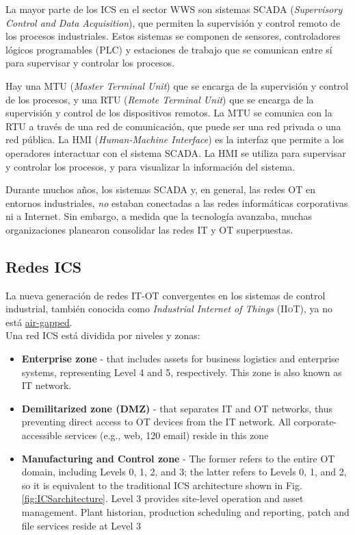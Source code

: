 La mayor parte de los \textsc{ICS} en el sector \textsc{WWS} son sistemas \textsc{SCADA} (\textit{Supervisory Control and Data Acquisition}), que permiten la supervisión y control remoto de los procesos industriales. Estos sistemas se componen de sensores, controladores lógicos programables (\textsc{PLC}) y estaciones de trabajo que se comunican entre sí para supervisar y controlar los procesos.

Hay una \textsc{MTU} (\textit{Master Terminal Unit}) que se encarga de la supervisión y control de los procesos, y una \textsc{RTU} (\textit{Remote Terminal Unit}) que se encarga de la supervisión y control de los dispositivos remotos. La \textsc{MTU} se comunica con la \textsc{RTU} a través de una red de comunicación, que puede ser una red privada o una red pública.
La \textsc{HMI} (\textit{Human-Machine Interface}) es la interfaz que permite a los operadores interactuar con el sistema \textsc{SCADA}. La \textsc{HMI} se utiliza para supervisar y controlar los procesos, y para visualizar la información del sistema.

Durante muchos años, los sistemas \textsc{SCADA} y, en general, las redes \textsc{OT} en entornos industriales, \textit{no} estaban conectadas a las redes informáticas corporativas ni a Internet. Sin embargo, a medida que la tecnología avanzaba, muchas organizaciones planearon consolidar las redes \textsc{IT} y \textsc{OT} superpuestas.

\subsection{Redes ICS}

La nueva generación de redes \textsc{IT-OT} convergentes en los sistemas de control industrial, también conocida como \textit{Industrial Internet of Things} (\textsc{IIoT}), ya no está \ul{air-gapped}.\\
Una red ICS está dividida por niveles y zonas:
\begin{itemize}
   \item \textbf{Enterprise zone }- that includes assets for business logistics and enterprise systems, representing Level 4 and 5, respectively. This zone is also known as \textsc{IT} network.
   \item \textbf{Demilitarized zone (DMZ) }- that separates \textsc{IT} and \textsc{OT} networks, thus preventing direct access to \textsc{OT} devices from the \textsc{IT} network. All corporate-accessible services (e.g., web, 120 email) reside in this zone
   \item \textbf{Manufacturing and Control zone }- The former refers to the entire OT domain, including Levels 0, 1, 2, and 3; the latter refers to Levels 0, 1, and 2, so it is equivalent to the traditional \textsc{ICS} architecture shown in Fig. \ref{fig:ICSarchitecture}. Level 3 provides site-level operation and asset management. Plant historian, production scheduling and reporting, patch and file services reside at Level 3 
\end{itemize}


